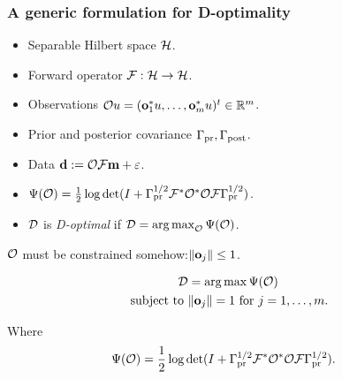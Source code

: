 \documentclass{beamer}
\begin{document}
\begin{frame}
\frametitle{A generic formulation for D-optimality}

\begin{itemize}
\item Separable Hilbert space \(\mathcal{H}\).
\item Forward operator \(\mathcal{F}: \mathcal{H} \to \mathcal{H}\).
\item Observations \(\mathcal{O} u = (\mathbf{o}_1^*u, \dots, \mathbf{o}_m^*u )^t \in \mathbb{R}^m\).
\item Prior and posterior covariance \( \Gamma_{\textup{pr}}, \Gamma_{\textup{post}}\).
\item Data \(\mathbf{d} := \mathcal{O} \mathcal{F} \mathbf{m} + \varepsilon\).
\item \(\Psi( \mathcal{O}) = \frac12 \log \det ( I + 
  \Gamma_{\textup{pr}}^{1/2} \mathcal{F} ^* \mathcal{O}^* \mathcal{O} \mathcal{F} \Gamma_{\textup{pr}}^{1/2})\).
\item \(\mathcal{D}\) is \emph{D-optimal} if \(\mathcal{D} = \operatorname*{arg\,max}_{\mathcal{O}}
  \Psi(\mathcal{O})\).
\end{itemize}

\pause \(\mathcal{O}\) must be constrained somehow:\pause \(\|\mathbf{o}_j\| \leq 1\).


\end{frame}

\begin{frame}
\begin{align*}
  \begin{split}
  \mathcal{D} &= \operatorname*{arg\,max}\Psi(\mathcal{O})\\
  \text{subject to }& \|\mathbf{o}_j\| = 1 \text{ for } j=1,\dots,m.
  \end{split}
\end{align*}

Where
\begin{align*}
  \begin{split}
    \tar(\obs) %
    &= \frac12 \log \det ( I + \prcov^{1/2} \fwd ^* \obs^* \obs \fwd
    \prcov^{1/2}).
  \end{split}
\end{align*}
\end{frame}
\end{document}
